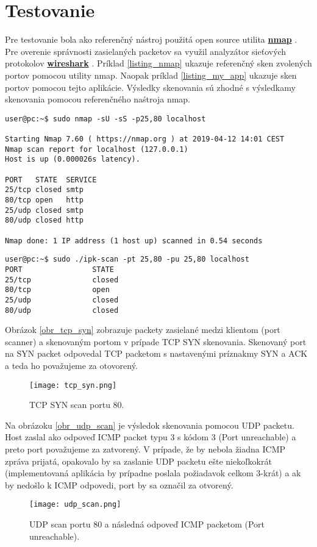 \documentclass[a4paper, 11pt]{article}
\begin{document}
\section{Testovanie}
Pre testovanie bola ako referenčný nástroj použitá open source utilita \href{https://nmap.org/}{\textbf{nmap}} . Pre overenie správnosti zasielaných packetov sa využil analyzátor sieťových protokolov \href{https://www.wireshark.org/}{\textbf{wireshark}} . Príklad \ref{listing_nmap} ukazuje referenčný sken zvolených portov pomocou utility nmap. Naopak príklad \ref{listing_my_app} ukazuje sken portov pomocou tejto aplikácie. Výsledky skenovania sú zhodné s výsledkamy skenovania pomocou referenčného naśtroja nmap.

\begin{lstlisting}[caption=Príklad skenovania pomocou utility nmap.]
user@pc:~$ sudo nmap -sU -sS -p25,80 localhost

Starting Nmap 7.60 ( https://nmap.org ) at 2019-04-12 14:01 CEST
Nmap scan report for localhost (127.0.0.1)
Host is up (0.000026s latency).

PORT   STATE  SERVICE
25/tcp closed smtp
80/tcp open   http
25/udp closed smtp
80/udp closed http

Nmap done: 1 IP address (1 host up) scanned in 0.54 seconds
\end{lstlisting}\label{listing_nmap}

\begin{lstlisting}[caption=Príklad skenovania portov touto aplikáciou.]
user@pc:~$ sudo ./ipk-scan -pt 25,80 -pu 25,80 localhost
PORT                STATE
25/tcp              closed
80/tcp              open
25/udp              closed
80/udp              closed
\end{lstlisting}\label{listing_my_app}

Obrázok \ref{obr_tcp_syn} zobrazuje packety zasielané medzi klientom (port scanner) a skenovaným portom v prípade TCP SYN skenovania. Skenovaný port na SYN packet odpovedal TCP packetom s nastavenými príznakmy SYN a ACK a teda ho považujeme za otovorený.
\begin{figure}[H] 
	\centering
	\texttt{[image: tcp\_syn.png]}
	\caption{TCP SYN scan portu 80.}
	\label{obr1}
\end{figure} \label{obr_tcp_syn}

Na obrázoku \ref{obr_udp_scan} je výsledok skenovania pomocou UDP packetu. Host zaslal ako odpoveď ICMP packet typu 3 s kódom 3 (Port unreachable) a preto port považujeme za zatvorený. V prípade, že by nebola žiadna ICMP zpráva prijatá, opakovalo by sa zaslanie UDP packetu ešte niekoľkokrát (implementovaná aplikácia by prípadne poslala požiadavok celkom 3-krát) a ak by nedošlo k ICMP odpovedi, port by sa označil za otvorený.

\begin{figure}[H] 
	\centering
	\texttt{[image: udp\_scan.png]}
	\caption{UDP scan portu 80 a následná odpoveď ICMP packetom (Port unreachable).}
	\label{obr1}
\end{figure} \label{obr_udp_scan}

\newpage


\end{document}
